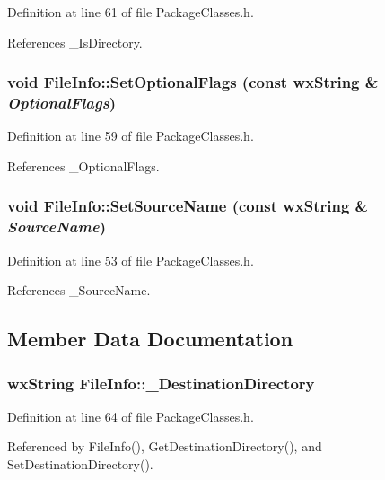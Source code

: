 Definition at line 61 of file Package\-Classes.h.

References \_\-Is\-Directory.
\subsubsection{\setlength{\rightskip}{0pt plus 5cm}void File\-Info::Set\-Optional\-Flags (const wx\-String \& {\em Optional\-Flags})\hspace{0.3cm}{\tt  [inline]}}\label{class_file_info_92539a24a29a2b15ef4e368531f146ac}




Definition at line 59 of file Package\-Classes.h.

References \_\-Optional\-Flags.
\subsubsection{\setlength{\rightskip}{0pt plus 5cm}void File\-Info::Set\-Source\-Name (const wx\-String \& {\em Source\-Name})\hspace{0.3cm}{\tt  [inline]}}\label{class_file_info_e52633affc20f7a2734034336b6353ea}




Definition at line 53 of file Package\-Classes.h.

References \_\-Source\-Name.

\subsection{Member Data Documentation}
\subsubsection{\setlength{\rightskip}{0pt plus 5cm}wx\-String {\bf File\-Info::\_\-Destination\-Directory}\hspace{0.3cm}{\tt  [private]}}\label{class_file_info_8a07b8c3b4a35410f7fd39addd182996}




Definition at line 64 of file Package\-Classes.h.

Referenced by File\-Info(), Get\-Destination\-Directory(), and Set\-Destination\-Directory().

